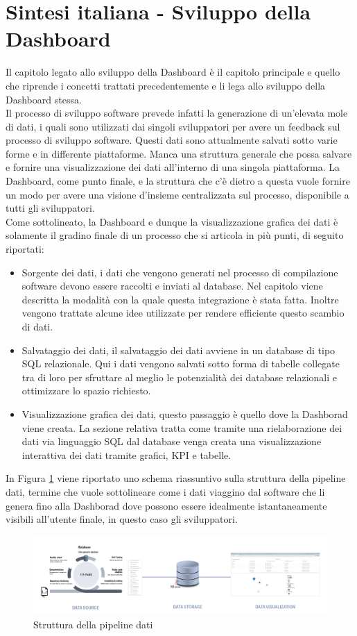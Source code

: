 \documentclass[../main.tex]{subfiles}
\begin{document}
\section{Sintesi italiana - Sviluppo della Dashboard}
Il capitolo legato allo sviluppo della Dashboard è il capitolo principale e quello che riprende i concetti trattati precedentemente  e li lega allo sviluppo della Dashboard stessa.\\
Il processo di sviluppo software prevede infatti la generazione di un'elevata mole di dati, i quali sono utilizzati dai singoli sviluppatori per avere un feedback sul processo di sviluppo software. Questi dati sono attualmente salvati sotto varie forme e in differente piattaforme. Manca una struttura generale che possa salvare e fornire una visualizzazione dei dati all'interno di una singola piattaforma. La Dashboard, come punto finale, e la struttura che c'è dietro a questa vuole fornire un modo per avere una visione d'insieme centralizzata sul processo, disponibile a tutti gli sviluppatori.\\
Come sottolineato, la Dashboard e dunque la visualizzazione grafica dei dati è solamente il gradino finale di un processo che si articola in più punti, di seguito riportati:
\begin{itemize}
    \item Sorgente dei dati, i dati che vengono generati nel processo di compilazione software devono essere raccolti e inviati al database. Nel capitolo viene descritta la modalità con la quale questa integrazione è stata fatta. Inoltre vengono trattate alcune idee utilizzate per rendere efficiente questo scambio di dati.
    \item Salvataggio dei dati, il salvataggio dei dati avviene in un database di tipo \gls{SQL} relazionale. Qui i dati vengono salvati sotto forma di tabelle collegate tra di loro per sfruttare al meglio le potenzialità dei database relazionali e ottimizzare lo spazio richiesto.
    \item Visualizzazione grafica dei dati, questo passaggio è quello dove la Dashborad viene creata. La sezione relativa tratta come tramite una rielaborazione dei dati via linguaggio SQL dal database venga creata una visualizzazione interattiva dei dati tramite grafici, \gls{KPI} e tabelle.
\end{itemize}
In Figura \ref{fig:pipelineita} viene riportato uno schema riassuntivo sulla struttura della pipeline dati, termine che vuole sottolineare come i dati viaggino dal software che li genera fino alla Dashborad dove possono essere idealmente istantaneamente visibili all'utente finale, in questo caso gli sviluppatori.
\begin{figure}[h]
    \centering
    \includegraphics[width=\linewidth]{images_folder/pipeline_1.png}
    \caption{Struttura della pipeline dati}
    \label{fig:pipelineita}
\end{figure}
\end{document}

